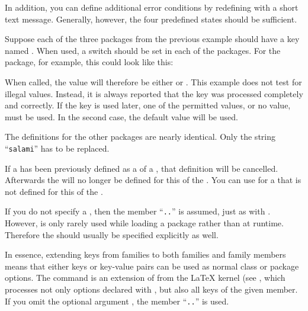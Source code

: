 In addition, you can define additional error conditions by redefining
 with a short text message. Generally, however, the four
predefined states should be sufficient.

\begin{Example}
  Suppose each of the three packages from the previous example should have a
  key named . When used, a switch should be set in each of
  the packages. For the  package, for example, this could look
  like this:
  When called, the value will therefore be either  or
  . This example does not test for illegal values. Instead,
  it is always reported that the key was processed completely and correctly.
  If the key is used later, one of the permitted values, or no value, must be
  used. In the second case, the default  value will be used.

  The definitions for the other packages are nearly identical. Only the string
  ``\texttt{salami}'' has to be replaced.
\end{Example}
%
\EndIndexGroup


\begin{Declaration}
\end{Declaration}
If a  has been previously
defined as a  of a , that definition will be
cancelled. Afterwards the  will no longer be defined for this
 of the . You can use  for a
 that is not defined for this  of the .

If you do not specify a , then the member
``\texttt{.}\texttt{.}'' is assumed, just as
with . However, 
is only rarely used while loading a package rather than at runtime. Therefore
the  should usually be specified explicitly as well.%
\EndIndexGroup


\begin{Declaration}
\end{Declaration}
In essence, extending keys from families to both families and family members
means that either keys or key-value pairs can be used as normal class or
package options. The  command is an extension of
 from the \LaTeX{} kernel (see \cite{latex:clsguide},
which processes not only options declared with , but also
all keys of the given member. If you omit the optional argument
, the member
``\texttt{.}\texttt{.}'' is used.

